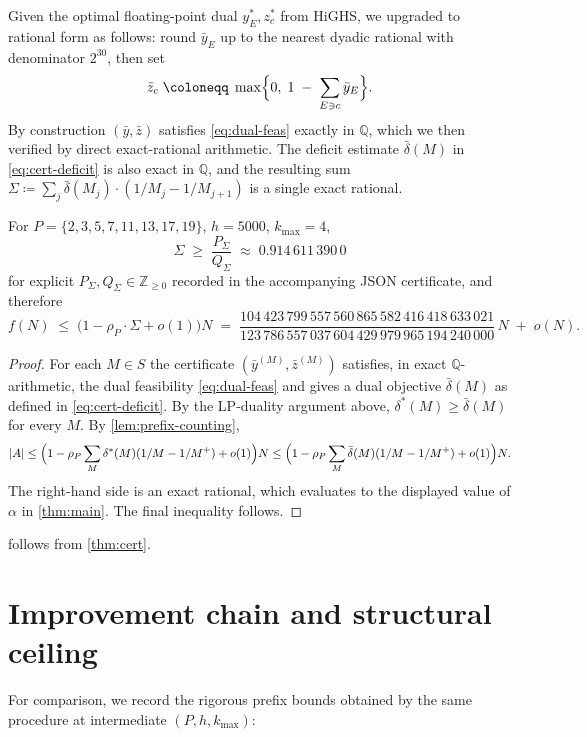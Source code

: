 \documentclass{amsart}
\begin{document}
Given the optimal floating-point dual $y_E^{*}, z_c^{*}$ from HiGHS, we
upgraded to rational form as follows: round $\bar{y}_E$ up to the
nearest dyadic rational with denominator $2^{30}$, then set
\[
    \bar{z}_c \;\coloneqq\; \max\Bigl\{0,\; 1 \;-\; \sum_{E \ni c} \bar{y}_E\Bigr\}.
\]
By construction $(\bar{y}, \bar{z})$ satisfies \eqref{eq:dual-feas} exactly
in $\mathbb{Q}$, which we then verified by direct exact-rational arithmetic.
The deficit estimate $\bar{\delta}(M)$ in \eqref{eq:cert-deficit} is also
exact in $\mathbb{Q}$, and the resulting sum
$\Sigma \coloneqq \sum_{j} \bar{\delta}(M_j) \cdot (1/M_j - 1/M_{j+1})$
is a single exact rational.

\begin{theorem}\label{thm:cert}
For $P = \{2, 3, 5, 7, 11, 13, 17, 19\}$, $h = 5000$, $k_{\max} = 4$,
\[
    \Sigma \;\geq\; \frac{P_\Sigma}{Q_\Sigma}
    \;\approx\; 0.914\,611\,390\,0
\]
for explicit $P_\Sigma, Q_\Sigma \in \mathbb{Z}_{\geq 0}$ recorded in the
accompanying JSON certificate, and therefore
\[
    f(N) \;\leq\; \bigl(1 - \rho_P \cdot \Sigma + o(1)\bigr) N
    \;=\; \frac{104\,423\,799\,557\,560\,865\,582\,416\,418\,633\,021}
              {123\,786\,557\,037\,604\,429\,979\,965\,194\,240\,000}\, N \;+\; o(N).
\]
\end{theorem}

\begin{proof}
For each $M \in S$ the certificate $(\bar{y}^{(M)}, \bar{z}^{(M)})$ satisfies, in exact $\mathbb{Q}$-arithmetic, the dual feasibility \eqref{eq:dual-feas} and gives a dual objective $\bar{\delta}(M)$ as defined in \eqref{eq:cert-deficit}. By the LP-duality argument above, $\delta^*(M) \geq \bar{\delta}(M)$ for every $M$. By \cref{lem:prefix-counting},
\[
    |A| \leq \Bigl(1 - \rho_P \sum_M \delta^*(M) (1/M - 1/M^+) + o(1) \Bigr) N
         \leq \Bigl(1 - \rho_P \sum_M \bar{\delta}(M) (1/M - 1/M^+) + o(1) \Bigr) N.
\]
The right-hand side is an exact rational, which evaluates to the displayed value of $\alpha$ in \cref{thm:main}. The final inequality follows.
\end{proof}

 follows from \cref{thm:cert}.

\section*{Improvement chain and structural ceiling}

For comparison, we record the rigorous prefix bounds obtained by the same procedure at intermediate $(P, h, k_{\max})$:
\end{document}
